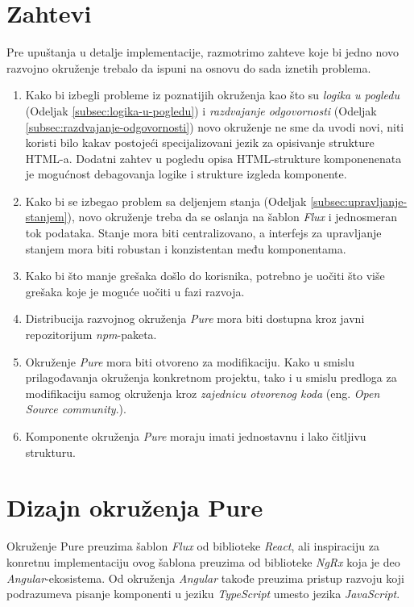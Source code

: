 \documentclass[12pt,oneside]{memoir}
\begin{document}
\section{Zahtevi}
Pre upuštanja u detalje implementacije, razmotrimo zahteve
koje bi jedno novo razvojno okruženje trebalo da ispuni na
osnovu do sada iznetih problema.
\begin{enumerate}
  \item Kako bi izbegli probleme iz poznatijih okruženja kao što su
  \emph{logika u pogledu} (Odeljak \ref{subsec:logika-u-pogledu}) i
  \emph{razdvajanje odgovornosti} (Odeljak \ref{subsec:razdvajanje-odgovornosti})
  novo okruženje ne sme da uvodi novi, niti koristi bilo kakav postojeći
  specijalizovani jezik za opisivanje strukture HTML-a. Dodatni zahtev u pogledu
  opisa HTML-strukture komponenenata je mogućnost debagovanja
  logike i strukture izgleda komponente.
  \item 
  Kako bi se izbegao problem sa deljenjem stanja (Odeljak \ref{subsec:upravljanje-stanjem}),
  novo okruženje treba da
  se oslanja na šablon \emph{Flux} i jednosmeran tok podataka.
  Stanje mora biti centralizovano, a interfejs za upravljanje stanjem
  mora biti robustan i konzistentan među komponentama.
 \item Kako bi što manje grešaka došlo do korisnika, potrebno je uočiti
 što više grešaka koje je moguće uočiti u fazi razvoja.
 \item Distribucija razvojnog okruženja \emph{Pure} mora biti dostupna kroz
 javni repozitorijum \emph{npm}-paketa.
 \item Okruženje \emph{Pure} mora biti otvoreno za modifikaciju. Kako u smislu prilagođavanja okruženja konkretnom projektu,
tako i u smislu predloga za modifikaciju samog okruženja kroz \emph{zajednicu otvorenog koda} (eng. \emph{Open Source community}.).
 \item Komponente okruženja \emph{Pure} moraju imati jednostavnu i lako čitljivu strukturu. 
\end{enumerate}

\section{Dizajn okruženja Pure}
Okruženje Pure preuzima šablon \emph{Flux} od biblioteke \emph{React}, ali inspiraciju za konretnu implementaciju ovog šablona
preuzima od biblioteke \emph{NgRx} koja je deo \emph{Angular}-ekosistema. Od okruženja \emph{Angular}
takođe preuzima pristup razvoju koji podrazumeva pisanje komponenti u jeziku \emph{TypeScript} umesto jezika \emph{JavaScript}.
\end{document}
